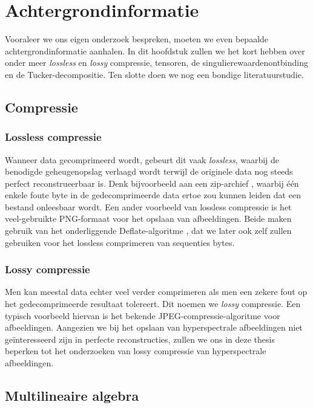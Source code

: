 \chapter{Achtergrondinformatie}
\label{hoofdstuk:achtergrond}

Vooraleer we ons eigen onderzoek bespreken, moeten we even bepaalde achtergrondinformatie aanhalen. In dit hoofdstuk zullen we het kort hebben over onder meer \textit{lossless} en \textit{lossy} compressie, tensoren, de singulierewaardenontbinding en de Tucker-decompositie. Ten slotte doen we nog een bondige literatuurstudie.

\section{Compressie}

\subsection{Lossless compressie}

Wanneer data gecomprimeerd wordt, gebeurt dit vaak \textit{lossless}, waarbij de benodigde geheugenopslag verlaagd wordt terwijl de originele data nog steeds perfect reconstrueerbaar is. Denk bijvoorbeeld aan een zip-archief \cite{ref:zip}, waarbij \'e\'en enkele foute byte in de gedecomprimeerde data ertoe zou kunnen leiden dat een bestand onleesbaar wordt. Een ander voorbeeld van lossless compressie is het veel-gebruikte PNG-formaat \cite{ref:png} voor het opslaan van afbeeldingen. Beide maken gebruik van het onderliggende Deflate-algoritme \cite{ref:deflate}, dat we later ook zelf zullen gebruiken voor het lossless comprimeren van sequenties bytes.

\subsection{Lossy compressie}

Men kan meestal data echter veel verder comprimeren als men een zekere fout op het gedecomprimeerde resultaat tolereert. Dit noemen we \textit{lossy} compressie. Een typisch voorbeeld hiervan is het bekende JPEG-compressie-algoritme \cite{ref:jpeg} voor afbeeldingen. Aangezien we bij het opslaan van hyperspectrale afbeeldingen niet ge\"interesseerd zijn in perfecte reconstructies, zullen we ons in deze thesis beperken tot het onderzoeken van lossy compressie van hyperspectrale afbeeldingen.

\newpage
\section{Multilineaire algebra}


